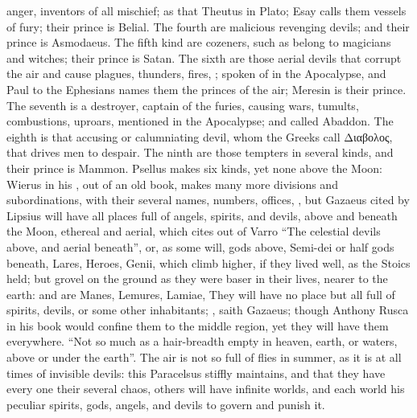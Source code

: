 anger, inventors of all mischief; as that Theutus in Plato; Esay calls them
vessels of fury; their prince is Belial. The fourth are
malicious revenging devils; and their prince is Asmodaeus. The fifth kind are
cozeners, such as belong to magicians and witches; their prince is Satan. The
sixth are those aerial devils that corrupt the air and
cause plagues, thunders, fires, \etc{}; spoken of in the Apocalypse, and Paul
to the Ephesians names them the princes of the air; Meresin is their prince.
The seventh is a destroyer, captain of the furies, causing wars, tumults,
combustions, uproars, mentioned in the Apocalypse; and called Abaddon. The
eighth is that accusing or calumniating devil, whom the Greeks call
\textgreek{Διαβολος}, that drives men to despair. The ninth are those tempters
in several kinds, and their prince is Mammon. Psellus makes six kinds, yet none
above the Moon: Wierus in his ,
out of an old book, makes many more divisions and subordinations, with their
several names, numbers, offices, \etc{}, but Gazaeus cited by
Lipsius will have all places full of angels, spirits, and
devils, above and beneath the Moon, ethereal and aerial,
which \Austin{} cites out of Varro 
\enquote{The celestial devils above, and aerial beneath}, or, as some will, gods above,
Semi-dei or half gods beneath, Lares, Heroes, Genii, which climb higher, if
they lived well, as the Stoics held; but grovel on the ground as they were
baser in their lives, nearer to the earth: and are Manes, Lemures, Lamiae,
\etc{} They will have no place but all full of spirits,
devils, or some other inhabitants; , saith Gazaeus; though Anthony Rusca in his
book  would confine them to
the middle region, yet they will have them everywhere. \enquote{Not so much as a
hair-breadth empty in heaven, earth, or waters, above or under the earth}. The
air is not so full of flies in summer, as it is at all times of invisible
devils: this Paracelsus stiffly maintains, and that they
have every one their several chaos, others will have infinite worlds, and each
world his peculiar spirits, gods, angels, and devils to govern and punish it.


